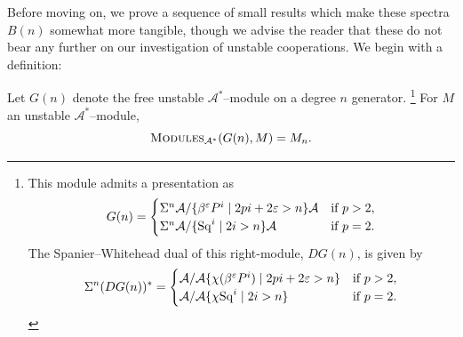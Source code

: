 Before moving on, we prove a sequence of small results which make these spectra \(B(n)\) somewhat more tangible, though we advise the reader that these do not bear any further on our investigation of unstable cooperations.
We begin with a definition:

\begin{definition}\label{SpanierWhiteheadDualOfGeneratingModule}
Let \(G(n)\) denote the free unstable \(\mathcal A^*\)--module on a degree \(n\) generator.%
\footnote{%
This module admits a presentation as \[G(n) = \begin{cases} \Sigma^n \mathcal A / \{\beta^\varepsilon P^i \mid 2pi + 2\varepsilon > n\}\mathcal A & \text{if \(p > 2\)}, \\ \Sigma^n \mathcal A / \{\operatorname{Sq}^i \mid 2i > n\}\mathcal A & \text{if \(p = 2\)}. \end{cases}\]
The Spanier--Whitehead dual of this right-module, \(DG(n)\), is given by \[\Sigma^n (D G(n))^* = \begin{cases}\mathcal A / \mathcal A \{\chi(\beta^\varepsilon P^i) \mid 2pi + 2\varepsilon > n\} & \text{if \(p > 2\)}, \\ \mathcal A / \mathcal A \{\chi{\operatorname{Sq}^i} \mid 2i > n\} & \text{if \(p = 2\)}. \end{cases}\]
}
For \(M\) an unstable \(\mathcal A^*\)--module, \[\normalfont\textsc{Modules}_{\mathcal A^*}(G(n), M) = M_n.\]
\end{definition}


